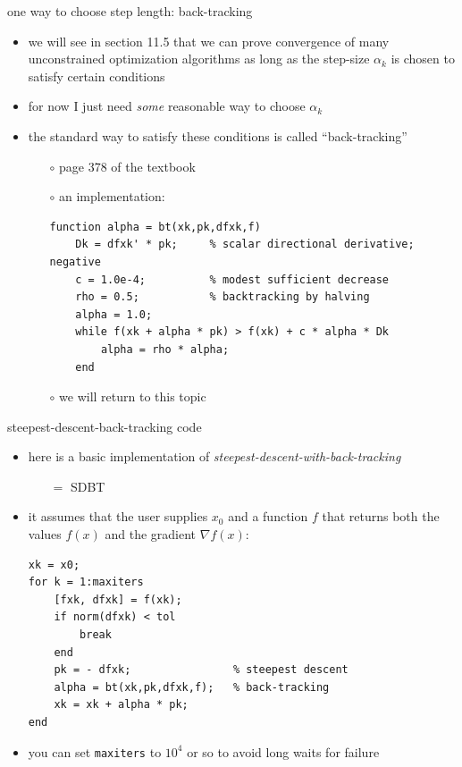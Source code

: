 \documentclass[10pt,hyperref]{beamer}
\newcommand{\grad}{\nabla}
\begin{document}
\begin{frame}[fragile]{one way to choose step length: back-tracking}

\begin{itemize}
\item we will see in section 11.5 that we can prove convergence of many unconstrained optimization algorithms as long as the step-size $\alpha_k$ is chosen to satisfy certain conditions
\item for now I just need \emph{some} reasonable way to choose $\alpha_k$
\item the standard way to satisfy these conditions is called ``back-tracking''
    \begin{itemize}
    \item[$\circ$] page 378 of the textbook
    \item[$\circ$] an implementation:

\medskip
\begin{Verbatim}[fontsize=\scriptsize]
    function alpha = bt(xk,pk,dfxk,f)
    Dk = dfxk' * pk;     % scalar directional derivative; negative
    c = 1.0e-4;          % modest sufficient decrease
    rho = 0.5;           % backtracking by halving
    alpha = 1.0;
    while f(xk + alpha * pk) > f(xk) + c * alpha * Dk
        alpha = rho * alpha;
    end
\end{Verbatim}

\medskip
    \item[$\circ$] we will return to this topic
    \end{itemize}
\end{itemize}
\end{frame}


\begin{frame}[fragile]{steepest-descent-back-tracking code}

\begin{itemize}
\item here is a basic implementation of \emph{steepest-descent-with-back-tracking}
    \begin{itemize}
    \item[$=$] SDBT
    \end{itemize}
\item it assumes that the user supplies $x_0$ and a function $f$ that returns both the values $f(x)$ and the gradient $\grad f(x)$:

\medskip
\begin{Verbatim}[fontsize=\small]
xk = x0;
for k = 1:maxiters
    [fxk, dfxk] = f(xk);
    if norm(dfxk) < tol
        break
    end
    pk = - dfxk;                % steepest descent
    alpha = bt(xk,pk,dfxk,f);   % back-tracking
    xk = xk + alpha * pk;
end
\end{Verbatim}

\medskip
\item you can set \texttt{maxiters} to $10^4$ or so to avoid long waits for failure
\end{itemize}
\end{frame}
\end{document}
